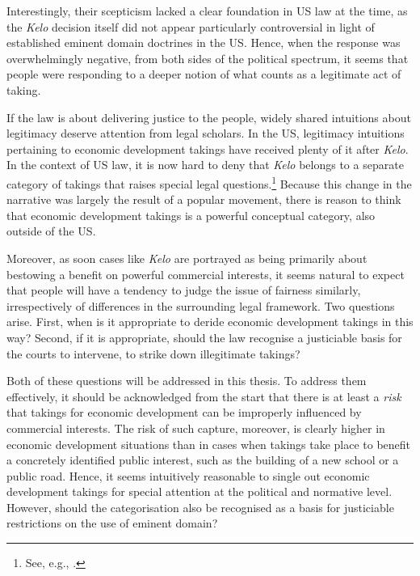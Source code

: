 Interestingly, their scepticism lacked a clear foundation in US law at the time, as the {\it Kelo} decision itself did not appear particularly controversial in light of established eminent domain doctrines in the US. Hence, when the response was overwhelmingly negative, from both sides of the political spectrum, it seems that people were responding to a deeper notion of what counts as a legitimate act of taking.


If the law is about delivering justice to the people, widely shared intuitions about legitimacy deserve attention from legal scholars. In the US, legitimacy intuitions pertaining to economic development takings have received plenty of it after {\it Kelo}. In the context of US law, it is now hard to deny that {\it Kelo} belongs to a separate category of takings that raises special legal questions.\footnote{See, e.g., \cite{cohen06,somin07}.} Because this change in the narrative was largely the result of a popular movement, there is reason to think that economic development takings is a powerful conceptual category, also outside of the US. 

Moreover, as soon cases like {\it Kelo} are portrayed as being primarily about bestowing a benefit on powerful commercial interests, it seems natural to expect that people will have a tendency to judge the issue of fairness similarly, irrespectively of differences in the surrounding legal framework. Two questions arise. First, when is it appropriate to deride economic development takings in this way? Second, if it is appropriate, should the law recognise a justiciable basis for the courts to intervene, to strike down illegitimate takings?

Both of these questions will be addressed in this thesis. To address them effectively, it should be acknowledged from the start that there is at least a {\it risk} that takings for economic development can be improperly influenced by commercial interests. The risk of such capture, moreover, is clearly higher in economic development situations than in cases when takings take place to benefit a concretely identified public interest, such as the building of a new school or a public road. Hence, it seems intuitively reasonable to single out economic development takings for special attention at the political and normative level. However, should the categorisation also be recognised as a basis for justiciable restrictions on the use of eminent domain?

